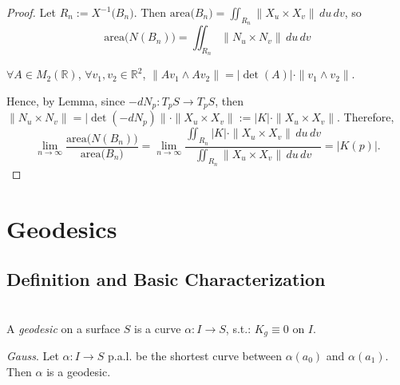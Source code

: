 \begin{proof}
Let $R_n := X^{-1}\big(B_n\big)$. Then $\mathrm{area}\big(B_n\big) = \iint_{R_n}\|X_u\times X_v\|\,du\,dv$, so
\[
\mathrm{area}\big(N(B_n)\big) = \iint_{R_n}\|N_u\times N_v\|\,du\,dv
\]
\begin{lemma}
$\forall A\in M_2(\mathbb{R})$, $\forall v_1, v_2\in\mathbb{R}^2$, $\|Av_1\wedge Av_2\| = |\det(A)|\cdot\|v_1\wedge v_2\|$.
\end{lemma}

\noindent Hence, by Lemma, since $-dN_p :T_pS\to T_pS$, then $\|N_u\times N_v\| = \big|\det(-dN_p)\|\cdot\|X_u\times X_v\| := |K|\cdot\|X_u\times X_v\|$. Therefore,
\[
\lim_{n\to\infty}\frac{\mathrm{area}\big(N(B_n)\big)}{\mathrm{area}\big(B_n\big)} = \lim_{n\to\infty}\frac{\iint_{R_n}|K|\cdot\|X_u\times X_v\|\,du\,dv}{\iint_{R_n}\|X_u\times X_v\|\,du\,dv} = |K(p)|.
\]
\end{proof}

\section{Geodesics}

\subsection{Definition and Basic Characterization}

\\
A \textit{geodesic} on a surface $S$ is a curve $\alpha: I\to S$, s.t.: $K_g\equiv 0$ on $I$.

\begin{theorem}
\textit{Gauss}. Let $\alpha: I\to S$ p.a.l. be the shortest curve between $\alpha(a_0)$ and $\alpha(a_1)$. Then $\alpha$ is a geodesic.
\end{theorem}

